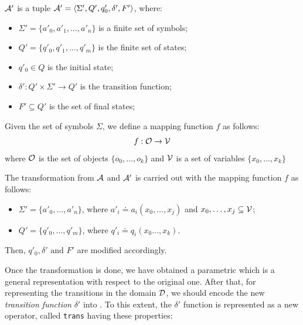\begin{definition}\label{plan:automaton-prime}
$\mathcal{A}'$ is a tuple $\mathcal{A}' = \langle \Sigma', Q', q'_0 , \delta', F' \rangle$, where:
\begin{itemize}		
\item $\Sigma' = \{ a'_0,a'_1,\dots,a'_n \}$ is a finite set of symbols;
\item $Q' = \{ q'_0,q'_1,\dots,q'_m \}$ is the finite set of states;
\item $q'_0 \in Q$ is the initial state;
\item $\delta': Q' \times \Sigma' \rightarrow Q'$ is the transition function;
\item $F' \subseteq Q'$ is the set of final states;
\end{itemize}
\end{definition}

\begin{definition}\label{plan:mapfunc}
Given the set of \DFA symbols $\Sigma$, we define a mapping function $f$ as follows:
\begin{equation}
f: \mathcal{O} \rightarrow \mathcal{V}
\end{equation}
where $\mathcal{O}$ is the set of objects $\{o_0,\dots,o_k\}$ and $\mathcal{V}$ is a set of variables $\{x_0,\dots,x_k\}$
\end{definition}

The transformation from $\mathcal{A}$ and $\mathcal{A}'$ is carried out with the mapping function $f$ as follows:
\begin{itemize}
\item $\Sigma' = \{ a'_0,\dots,a'_n \}$, where $a'_i \doteq a_i(x_0,\dots,x_j)$ and $x_0,\dots,x_j \subseteq \mathcal{V}$;
\item $Q' = \{ q'_0,\dots,q'_m \}$, where $q'_i \doteq q_i(x_0\dots, x_k)$.
\end{itemize}
Then, $q'_0, \delta' \text{ and } F'$ are modified accordingly.

Once the transformation is done, we have obtained a parametric \DFA which is a general representation with respect to the original one. After that, for representing the \DFA transitions in the domain $\mathcal{D}$, we should encode the new \textit{transition function} $\delta'$ into \PDDL. To this extent, the $\delta'$ function is represented as a new \PDDL operator, called \texttt{trans} having  these properties:

